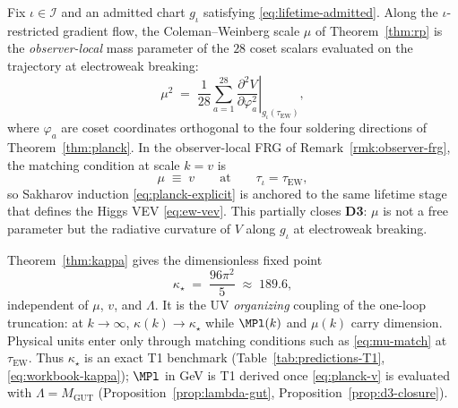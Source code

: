 \begin{proposition}
\label{prop:mu-lifetime}
Fix $\iota\in\mathcal{I}$ and an admitted chart $g_\iota$ satisfying
\eqref{eq:lifetime-admitted}. Along the $\iota$-restricted gradient flow,
the Coleman--Weinberg scale $\mu$ of Theorem~\ref{thm:rp} is the
\emph{observer-local} mass parameter of the $28$ coset scalars evaluated on
the trajectory at electroweak breaking:
\begin{equation}\label{eq:mu-tau-ew}
  \mu^2
  \;=\;
  \frac{1}{28}\sum_{a=1}^{28}
  \left.\frac{\partial^2 V}{\partial\varphi_a^2}\right|_{g_\iota(\tau_{\mathrm{EW}})},
\end{equation}
where $\varphi_a$ are coset coordinates orthogonal to the four soldering
directions of Theorem~\ref{thm:planck}. In the observer-local FRG of
Remark~\ref{rmk:observer-frg}, the matching condition at scale $k=v$ is
\begin{equation}\label{eq:mu-match}
  \mu\;\equiv\;v
  \qquad\text{at}\qquad
  \tau_\iota=\tau_{\mathrm{EW}},
\end{equation}
so Sakharov induction \eqref{eq:planck-explicit} is anchored to the same
lifetime stage that defines the Higgs VEV \eqref{eq:ew-vev}. This partially
closes \textbf{D3}: $\mu$ is not a free parameter but the radiative curvature
of $V$ along $g_\iota$ at electroweak breaking.
\end{proposition}

\begin{remark}
\label{rmk:kappa-star-organizing}
Theorem~\ref{thm:kappa} gives the dimensionless fixed point
\begin{equation}\label{eq:kappa-star-value}
  \kappa_\star \;=\; \frac{96\pi^2}{5} \;\approx\; 189.6,
\end{equation}
independent of $\mu$, $v$, and $\Lambda$. It is the UV \emph{organizing}
coupling of the one-loop truncation: at $k\to\infty$,
$\kappa(k)\to\kappa_\star$ while $\MPl(k)$ and $\mu(k)$ carry dimension.
Physical units enter only through matching conditions such as
\eqref{eq:mu-match} at $\tau_{\mathrm{EW}}$. Thus $\kappa_\star$ is an exact
T1 benchmark (Table~\ref{tab:predictions-T1},
\eqref{eq:workbook-kappa}); $\MPl$ in GeV is T1 derived once
\eqref{eq:planck-v} is evaluated with $\Lambda=M_{\mathrm{GUT}}$
(Proposition~\ref{prop:lambda-gut}, Proposition~\ref{prop:d3-closure}).
\end{remark}

